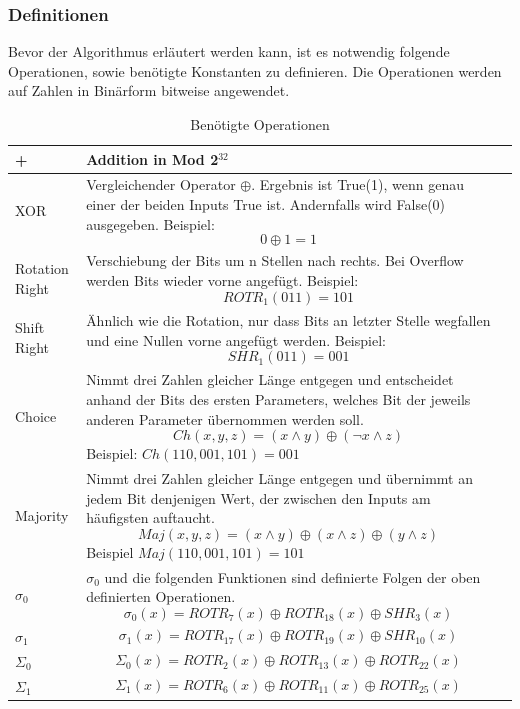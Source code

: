 \subsubsection{Definitionen}
Bevor der Algorithmus erläutert werden kann, ist es notwendig folgende Operationen, sowie benötigte Konstanten zu definieren. Die Operationen werden auf Zahlen in Binärform bitweise angewendet.
\begin{longtable}{p{3.5cm}p{10.5cm}l}
\caption{Benötigte Operationen}
	
		\\\toprule
		+  & Addition in Mod 2$^{32}$
		\\\midrule
		XOR  & Vergleichender Operator $\oplus$. Ergebnis ist True(1), wenn genau einer der beiden Inputs True ist. Andernfalls wird False(0) ausgegeben. Beispiel: $$0 \oplus 1 = 1$$
		\\\midrule
		Rotation Right  & Verschiebung der Bits um n Stellen nach rechts. Bei Overflow werden Bits wieder vorne angefügt. Beispiel: $$ROTR_1(011) = 101$$
		\\\midrule
		Shift Right  & Ähnlich wie die Rotation, nur dass Bits an letzter Stelle wegfallen und eine Nullen vorne angefügt werden. Beispiel: $$SHR_1(011) = 001$$
		\\\midrule
		Choice  & Nimmt drei Zahlen gleicher Länge entgegen und entscheidet anhand der Bits des ersten Parameters, welches Bit der jeweils anderen Parameter übernommen werden soll. $$Ch(x,y,z) = (x \land y)\oplus(\lnot x \land z)$$
		Beispiel: $Ch(110,001,101) = 001$
		\\\midrule
		Majority  & Nimmt drei Zahlen gleicher Länge entgegen und übernimmt an jedem Bit denjenigen Wert, der zwischen den Inputs am häufigsten auftaucht.
		$$Maj(x,y,z) = (x \land y)\oplus(x \land z)\oplus(y \land z)$$
		Beispiel $Maj(110,001,101) = 101$
		\\\midrule
		$\sigma_0$  & $\sigma_0$ und die folgenden Funktionen sind definierte Folgen der oben definierten Operationen.
		$$\sigma_0(x) = ROTR_7(x) \oplus ROTR_{18}(x) \oplus SHR_3(x)$$ 
		\\\midrule
		$\sigma_1$  & $$\sigma_1(x) = ROTR_{17}(x) \oplus ROTR_{19}(x) \oplus SHR_10(x)$$
		\\\midrule
		$\Sigma_0$  & $$\Sigma_0(x) = ROTR_2(x) \oplus ROTR_{13}(x) \oplus ROTR_{22}(x)$$
		\\\midrule
		$\Sigma_1$  & $$\Sigma_1(x) = ROTR_6(x) \oplus ROTR_{11}(x) \oplus ROTR_{25}(x)$$
		\\\bottomrule
\end{longtable}

